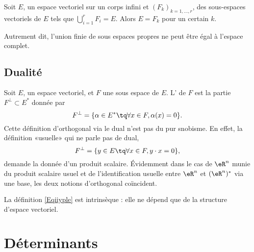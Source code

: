 \begin{proposition}   \label{PropTVKbxU}
    Soit \( E\), un espace vectoriel sur un corps infini et \( (F_k)_{k=1,\ldots, r}\), des sous-espaces vectoriels de \( E\) tels que \( \bigcup_{i=1}^rF_i=E\). Alors \( E=F_k\) pour un certain \( k\).

    Autrement dit, l'union finie de sous espaces propres ne peut être égal à l'espace complet.
\end{proposition}

\subsection{Dualité}

Soit \( E\), un espace vectoriel, et \( F\) une sous espace de \( E\). L' de \( F\) est la partie \( F^{\perp}\subset E^*\) donnée par
\begin{equation}    \label{Eqiiyple}
    F^{\perp}=\{ \alpha\in E^*\tq \forall x\in F,\alpha(x)=0 \}.
\end{equation}
Cette définition d'orthogonal via le dual n'est pas du pur snobisme. En effet, la définition «usuelle» qui ne parle pas de dual,
\begin{equation}
    F^{\perp}=\{ y\in E\tq \forall x\in F,y\cdot x=0 \},
\end{equation}
demande la donnée d'un produit scalaire. Évidemment dans le cas de \( \eR^n\) munie du produit scalaire usuel et de l'identification usuelle entre \( \eR^n\) et \( (\eR^n)^*\) via une base, les deux notions d'orthogonal coïncident.

La définition \eqref{Eqiiyple} est intrinsèque : elle ne dépend que de la structure d'espace vectoriel.

\section{Déterminants}



